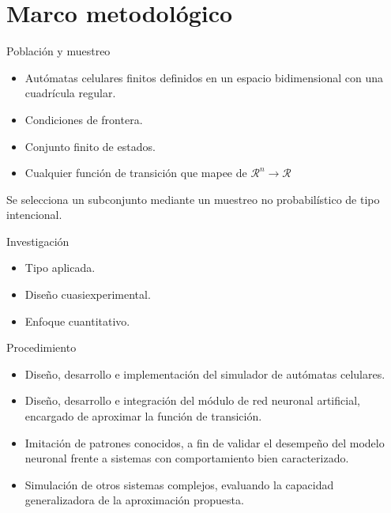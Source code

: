\section{Marco metodológico}

\begin{frame}{Población y muestreo}
	\centering
	\begin{itemize}
		\item Autómatas celulares finitos definidos en un espacio bidimensional con una cuadrícula regular.
		\item Condiciones de frontera.
		\item Conjunto finito de estados.
		\item Cualquier función de transición que mapee de $\mathcal{R}^n \to \mathcal{R}$
	\end{itemize}
	Se selecciona un subconjunto mediante un muestreo no probabilístico de tipo intencional.
\end{frame}

\begin{frame}{Investigación}
	\begin{itemize}
		\item Tipo aplicada.
		\item Diseño cuasiexperimental.
		\item Enfoque cuantitativo.
	\end{itemize}
\end{frame}

\begin{frame}{Procedimiento}
	\begin{itemize}
		\item Diseño, desarrollo e implementación del simulador de autómatas celulares.
		
		\item Diseño, desarrollo e integración del módulo de red neuronal artificial, encargado de aproximar la función de transición.
		
		\item Imitación de patrones conocidos, a fin de validar el desempeño del modelo neuronal frente a sistemas con comportamiento bien caracterizado.
		
		\item Simulación de otros sistemas complejos, evaluando la capacidad generalizadora de la aproximación propuesta.
		
		
	\end{itemize}
\end{frame}
